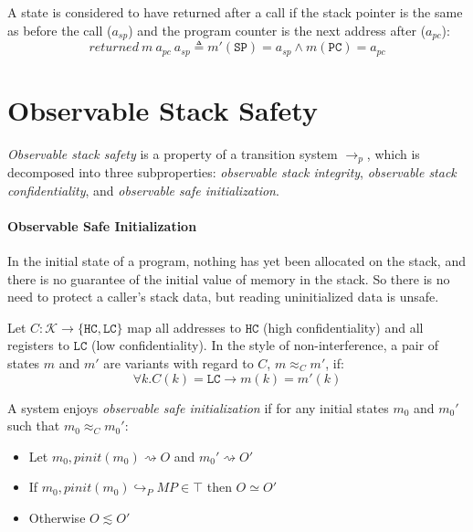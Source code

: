 \documentclass{article}
\begin{document}
      A state is considered to have returned after a call if the stack pointer is the same as before the call
      (\(a_{sp}\)) and the program counter is the next address after (\(a_{pc}\)):
      \[\mathit{returned}\ m\ a_{pc}\ a_{sp} \triangleq m'(\mathtt{SP}) = a_{sp} \land m(\mathtt{PC}) = a_{pc}\]

  \section{Observable Stack Safety}

    {\it Observable stack safety} is a property of a transition system \(\longrightarrow_p\),
    which is decomposed into three subproperties: {\it observable stack integrity},
    {\it observable stack confidentiality}, and {\it observable safe initialization}. 


    \paragraph{Observable Safe Initialization}

      In the initial state of a program, nothing has yet been allocated on the stack, and
      there is no guarantee of the initial value of memory in the stack. So there is no
      need to protect a caller's stack data, but reading uninitialized data is unsafe.

      Let \(C : \mathcal{K} \rightarrow \{\mathtt{HC},\mathtt{LC}\}\) map all addresses
      to \(\mathtt{HC}\) (high confidentiality) and all registers to \(\mathtt{LC}\)
      (low confidentiality). In the style of non-interference, a pair of states \(m\)
      and \(m'\) are variants with regard to \(C\), \(m \approx_C m'\), if:
      \[\forall k . C(k) = \mathtt{LC} \rightarrow m(k) = m'(k)\]
      
      A system enjoys {\it observable safe initialization} if for any initial states \(m_0\)
      and \(m_0'\) such that \(m_0 \approx_C m_0'\):

      \begin{itemize}
        \item Let \(m_0,\mathit{pinit}(m_0) \rightsquigarrow O\) and \(m_0' \rightsquigarrow O'\)
        \item If \(m_0,\mathit{pinit}(m_0) \hookrightarrow_P MP \in \top\) then \(O \simeq O'\)
        \item Otherwise \(O \lesssim O'\)
      \end{itemize}
\end{document}
